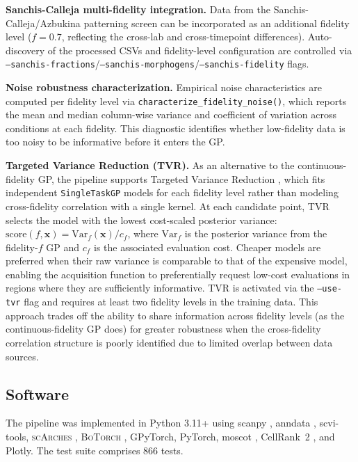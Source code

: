 \documentclass[times,twoside]{zHenriquesLab-StyleBioRxiv}
\newcommand{\scarches}{\textsc{scArches}}
\newcommand{\botorch}{\textsc{BoTorch}}
\begin{document}
\textbf{Sanchis-Calleja multi-fidelity integration.} Data from the Sanchis-Calleja/Azbukina patterning screen \cite{SanchisCalleja2025} can be incorporated as an additional fidelity level ($f{=}0.7$, reflecting the cross-lab and cross-timepoint differences). Auto-discovery of the processed CSVs and fidelity-level configuration are controlled via \texttt{--sanchis-fractions}/\texttt{--sanchis-morphogens}/\texttt{--sanchis-fidelity} flags.

\textbf{Noise robustness characterization.} Empirical noise characteristics are computed per fidelity level via \texttt{characterize\_fidelity\_noise()}, which reports the mean and median column-wise variance and coefficient of variation across conditions at each fidelity. This diagnostic identifies whether low-fidelity data is too noisy to be informative before it enters the GP.

\textbf{Targeted Variance Reduction (TVR).} As an alternative to the continuous-fidelity GP, the pipeline supports Targeted Variance Reduction \cite{Fare2022tvr, McDonald2025mfbo}, which fits independent \texttt{SingleTaskGP} models for each fidelity level rather than modeling cross-fidelity correlation with a single kernel. At each candidate point, TVR selects the model with the lowest cost-scaled posterior variance: $\text{score}(f, \bm{x}) = \text{Var}_f(\bm{x}) / c_f$, where $\text{Var}_f$ is the posterior variance from the fidelity-$f$ GP and $c_f$ is the associated evaluation cost. Cheaper models are preferred when their raw variance is comparable to that of the expensive model, enabling the acquisition function to preferentially request low-cost evaluations in regions where they are sufficiently informative. TVR is activated via the \texttt{--use-tvr} flag and requires at least two fidelity levels in the training data. This approach trades off the ability to share information across fidelity levels (as the continuous-fidelity GP does) for greater robustness when the cross-fidelity correlation structure is poorly identified due to limited overlap between data sources.

\subsection*{Software}

The pipeline was implemented in Python 3.11+ using scanpy \cite{Wolf2018scanpy}, anndata \cite{Virshup2024anndata}, scvi-tools, \scarches{} \cite{Lotfollahi2022scarches}, \botorch{} \cite{Balandat2020botorch}, GPyTorch, PyTorch, moscot \cite{Klein2025moscot}, CellRank~2 \cite{Weiler2024cellrank2}, and Plotly. The test suite comprises 866 tests.
\end{document}
